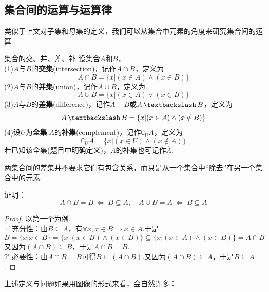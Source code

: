 \documentclass[lang=cn, zihao=5]{elegantbook}
\newcommand{\buzhou}[1]{$#1^{\circ} \ $}
\DeclareMathOperator{\setjianfa}{\textbackslash}
\begin{document}
\subsection{集合间的运算与运算律}

类似于上文对子集和母集的定义，我们可以从集合中元素的角度来研究集合间的运算.

\begin{definition}{集合的交、并、差、补}
	设集合$A$和$B$， \\
	(1)$A$与$B$的\textbf{交集}(intersection)，记作$A \cap B$，定义为$$A \cap B = \{ x|(x \in A) \wedge (x \in B) \}$$
	(2)$A$与$B$的\textbf{并集}(union)，记作$A \cup B$，定义为$$A \cup B = \{ x|(x \in A) \vee (x \in B) \}$$
	(3)$A$与$B$的\textbf{差集}(difference)，记作$A-B$或$A \setjianfa B$，定义为$$A \setjianfa B = \{ x|(x \in A) \wedge (x \notin B) \}$$
	(4)设$U$为\textbf{全集}.$A$的\textbf{补集}(complement)，记作$\complement _{U}{A}$，定义为$$\complement _{U}{A} = \{ x|(x \in U) \wedge (x \notin A) \}$$
	若已知该全集(题目中明确定义)，$A$的补集也可记作$\overline{A}$.
\end{definition}
\begin{note}
	两集合间的差集并不要求它们有包含关系，而只是从一个集合中“除去”在另一个集合中的元素.
\end{note}

\begin{problem}
	证明：$$A \cap B = B ~ \Leftrightarrow ~ B \subseteq A ,\quad A \cup B = A ~ \Leftrightarrow ~ B \subseteq A$$
\end{problem}
\begin{proof}
	以第一个为例. \\
	\buzhou{1}充分性：由$B \subseteq A$，有$\forall x, x \in B \Rightarrow x \in A$.于是$$B = \{ x|x \in B \} = \{ x|(x \in B) \wedge (x \in B) \} \subseteq \{ x|(x \in A) \wedge (x \in B) \} = A \cap B$$
	又因为$(A \cap B) \subseteq B$，于是$A \cap B = B$. \\
	\buzhou{2}必要性：由$A \cap B = B$可得$B \subseteq (A \cap B)$.又因为$(A \cap B) \subseteq A$，于是$B \subseteq A$.
\end{proof}

上述定义与问题如果用图像的形式来看，会自然许多：
\end{document}
